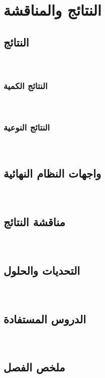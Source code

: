 \chapter{النتائج والمناقشة}
\label{ch:results}

\section{النتائج}
\label{sec:results}
~

\subsection{النتائج الكمية}
\label{subsec:quantitative-results}
~

\subsection{النتائج النوعية}
\label{subsec:qualitative-results}
~

\section{واجهات النظام النهائية}
\label{sec:final-ui}
~

\section{مناقشة النتائج}
\label{sec:discussion}
~

\section{التحديات والحلول}
\label{sec:challenges}
~

\section{الدروس المستفادة}
\label{sec:lessons-learned}
~

\section{ملخص الفصل}
\label{sec:results-summary}
~
